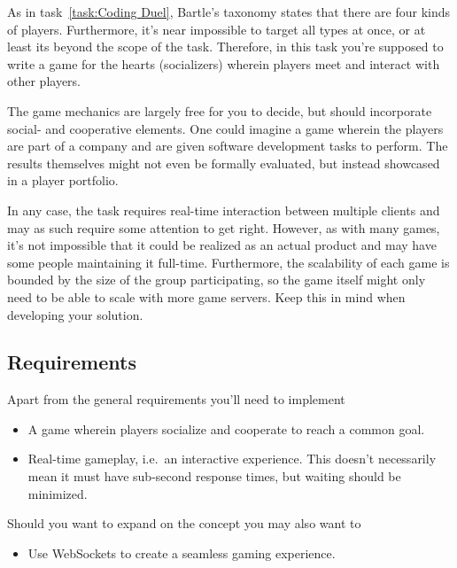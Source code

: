 \begin{refsection}
As in task~\ref{task:Coding Duel}, Bartle's taxonomy\supercite{bartle} states that there are four kinds of players. Furthermore, it's near impossible to target all types at once, or at least its beyond the scope of the task. Therefore, in this task you're supposed to write a game for the hearts (socializers) wherein players meet and interact with other players.

The game mechanics are largely free for you to decide, but should incorporate social- and cooperative elements. One could imagine a game wherein the players are part of a company and are given software development tasks to perform. The results themselves might not even be formally evaluated, but instead showcased in a player portfolio.

In any case, the task requires real-time interaction between multiple clients and may as such require some attention to get right. However, as with many games, it's not impossible that it could be realized as an actual product and may have some people maintaining it full-time. Furthermore, the scalability of each game is bounded by the size of the group participating, so the game itself might only need to be able to scale with more game servers. Keep this in mind when developing your solution.

\subsection*{Requirements}
Apart from the general requirements you'll need to implement
\begin{itemize}
    \item A game wherein players socialize and cooperate to reach a common goal.
    \item Real-time gameplay, i.e.\ an interactive experience. This doesn't necessarily mean it must have sub-second response times, but waiting should be minimized.
\end{itemize}
Should you want to expand on the concept you may also want to
\begin{itemize}
    \item Use WebSockets to create a seamless gaming experience.
\end{itemize}

\printbibliography[heading=subbibliography]
\end{refsection}
